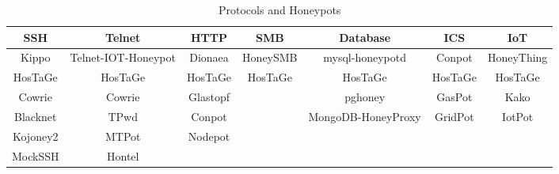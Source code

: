 \begin{table*}[ht!]
\caption{\label{tab:Table1}Protocols and Honeypots}
\centering
 \begin{tabular}{||c c c c c c c||} 
 \hline
 SSH & Telnet & HTTP & SMB & Database & ICS & IoT\\ [0.5ex] 
 \hline
 Kippo & Telnet-IOT-Honeypot & Dionaea & HoneySMB & mysql-honeypotd & Conpot & HoneyThing\\ 
 
 HosTaGe &  HosTaGe &  HosTaGe &  HosTaGe &  HosTaGe &  HosTaGe &  HosTaGe  \\
 
 Cowrie & Cowrie & Glastopf &  & pghoney & GasPot & Kako\\

 Blacknet & TPwd & Conpot &  & MongoDB-HoneyProxy & GridPot & IotPot\\
 
 Kojoney2 & MTPot & Nodepot & & & & \\
 
 MockSSH & Hontel &  &  & & & \\ [1ex] 
 \hline
\end{tabular}

\end{table*}
